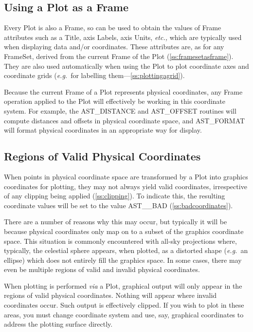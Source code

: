 \documentclass[twoside,11pt]{article}
\newcommand{\htmlref}[2]{#1}
\newcommand{\secref}[1]{\S\ref{#1}}
\renewcommand{\secref}[1]{\ref{#1}}
\begin{document}
\subsection{Using a Plot as a Frame}

Every \htmlref{Plot}{Plot} is also a \htmlref{Frame}{Frame}, so can be used to obtain the values of
Frame attributes such as a \htmlref{Title}{Title}, axis Labels, axis Units,
{\em{etc.,}} which are typically used when displaying data and/or
coordinates. These attributes are, as for any \htmlref{FrameSet}{FrameSet}, derived from
the current Frame of the Plot (\secref{ss:framesetasframe}). They are
also used automatically when using the Plot to plot coordinate axes
and coordinate grids ({\em{e.g.}}\ for labelling
them---\secref{ss:plottingagrid}).

Because the current Frame of a Plot represents physical coordinates,
any Frame operation applied to the Plot will effectively be working in
this coordinate system. For example, the \htmlref{AST\_DISTANCE}{AST_DISTANCE} and \htmlref{AST\_OFFSET}{AST_OFFSET}
routines will compute distances and offsets in physical coordinate
space, and \htmlref{AST\_FORMAT}{AST_FORMAT} will format physical coordinates in an
appropriate way for display.

\subsection{\label{ss:validphysicalcoordinates}Regions of Valid Physical Coordinates}

When points in physical coordinate space are transformed by a \htmlref{Plot}{Plot}
into graphics coordinates for plotting, they may not always yield
valid coordinates, irrespective of any clipping being applied
(\secref{ss:clipping}). To indicate this, the resulting coordinate
values will be set to the value AST\_\_BAD
(\secref{ss:badcoordinates}).

There are a number of reasons why this may occur, but typically it
will be because physical coordinates only map on to a subset of the
graphics coordinate space. This situation is commonly encountered with
all-sky projections where, typically, the celestial sphere appears,
when plotted, as a distorted shape ({\em{e.g.}}\ an ellipse) which
does not entirely fill the graphics space. In some cases, there may
even be multiple regions of valid and invalid physical coordinates.

When plotting is performed {\em{via}} a Plot, graphical output will
only appear in the regions of valid physical coordinates. Nothing will
appear where invalid coordinates occur. Such output is effectively
clipped. If you wish to plot in these areas, you must change
coordinate system and use, say, graphical coordinates to address the
plotting surface directly.
\end{document}
